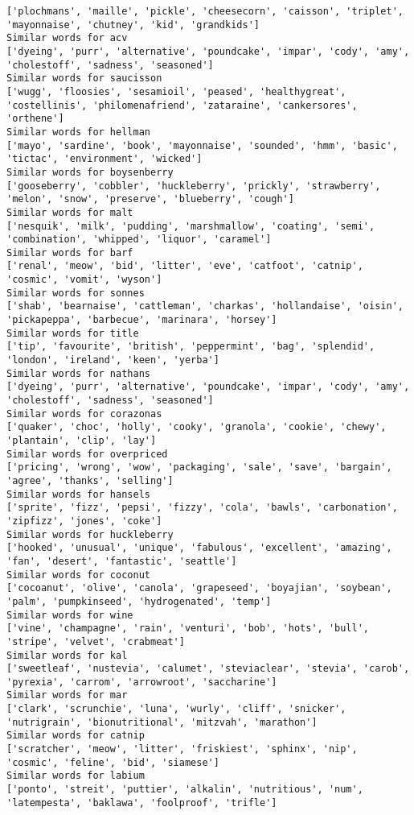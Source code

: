 \documentclass[11pt]{article}
\begin{document}
\begin{Verbatim}[commandchars=\\\{\}]
['plochmans', 'maille', 'pickle', 'cheesecorn', 'caisson', 'triplet', 'mayonnaise', 'chutney', 'kid', 'grandkids']
Similar words for acv
['dyeing', 'purr', 'alternative', 'poundcake', 'impar', 'cody', 'amy', 'cholestoff', 'sadness', 'seasoned']
Similar words for saucisson
['wugg', 'floosies', 'sesamioil', 'peased', 'healthygreat', 'costellinis', 'philomenafriend', 'zataraine', 'cankersores', 'orthene']
Similar words for hellman
['mayo', 'sardine', 'book', 'mayonnaise', 'sounded', 'hmm', 'basic', 'tictac', 'environment', 'wicked']
Similar words for boysenberry
['gooseberry', 'cobbler', 'huckleberry', 'prickly', 'strawberry', 'melon', 'snow', 'preserve', 'blueberry', 'cough']
Similar words for malt
['nesquik', 'milk', 'pudding', 'marshmallow', 'coating', 'semi', 'combination', 'whipped', 'liquor', 'caramel']
Similar words for barf
['renal', 'meow', 'bid', 'litter', 'eve', 'catfoot', 'catnip', 'cosmic', 'vomit', 'wyson']
Similar words for sonnes
['shab', 'bearnaise', 'cattleman', 'charkas', 'hollandaise', 'oisin', 'pickapeppa', 'barbecue', 'marinara', 'horsey']
Similar words for title
['tip', 'favourite', 'british', 'peppermint', 'bag', 'splendid', 'london', 'ireland', 'keen', 'yerba']
Similar words for nathans
['dyeing', 'purr', 'alternative', 'poundcake', 'impar', 'cody', 'amy', 'cholestoff', 'sadness', 'seasoned']
Similar words for corazonas
['quaker', 'choc', 'holly', 'cooky', 'granola', 'cookie', 'chewy', 'plantain', 'clip', 'lay']
Similar words for overpriced
['pricing', 'wrong', 'wow', 'packaging', 'sale', 'save', 'bargain', 'agree', 'thanks', 'selling']
Similar words for hansels
['sprite', 'fizz', 'pepsi', 'fizzy', 'cola', 'bawls', 'carbonation', 'zipfizz', 'jones', 'coke']
Similar words for huckleberry
['hooked', 'unusual', 'unique', 'fabulous', 'excellent', 'amazing', 'fan', 'desert', 'fantastic', 'seattle']
Similar words for coconut
['cocoanut', 'olive', 'canola', 'grapeseed', 'boyajian', 'soybean', 'palm', 'pumpkinseed', 'hydrogenated', 'temp']
Similar words for wine
['vine', 'champagne', 'rain', 'venturi', 'bob', 'hots', 'bull', 'stripe', 'velvet', 'crabmeat']
Similar words for kal
['sweetleaf', 'nustevia', 'calumet', 'steviaclear', 'stevia', 'carob', 'pyrexia', 'carrom', 'arrowroot', 'saccharine']
Similar words for mar
['clark', 'scrunchie', 'luna', 'wurly', 'cliff', 'snicker', 'nutrigrain', 'bionutritional', 'mitzvah', 'marathon']
Similar words for catnip
['scratcher', 'meow', 'litter', 'friskiest', 'sphinx', 'nip', 'cosmic', 'feline', 'bid', 'siamese']
Similar words for labium
['ponto', 'streit', 'puttier', 'alkalin', 'nutritious', 'num', 'latempesta', 'baklawa', 'foolproof', 'trifle']

\end{Verbatim}
\end{document}
